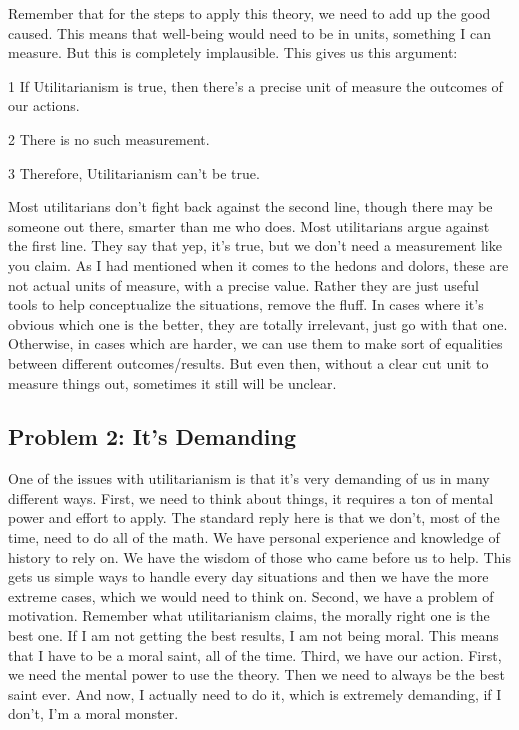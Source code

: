 Remember that for the steps to apply this theory, we need to add up the good caused. This means that well-being would need to be in units, something I can measure. But this is completely implausible. This gives us this argument:
\begin{earg}
    \item[1] If Utilitarianism is true, then there’s a precise unit of measure the outcomes of our actions.
    \item[2] There is no such measurement.
    \item[3] Therefore, Utilitarianism can’t be true.
\end{earg}
Most utilitarians don’t fight back against the second line, though there may be someone out there, smarter than me who does. Most utilitarians argue against the first line. They say that yep, it’s true, but we don’t need a measurement like you claim. As I had mentioned when it comes to the hedons and dolors, these are not actual units of measure, with a precise value. Rather they are just useful tools to help conceptualize the situations, remove the fluff. In cases where it’s obvious which one is the better, they are totally irrelevant, just go with that one. Otherwise, in cases which are harder, we can use them to make sort of equalities between different outcomes/results. But even then, without a clear cut unit to measure things out, sometimes it still will be unclear. 
\subsection{Problem 2: It’s Demanding}

One of the issues with utilitarianism is that it’s very demanding of us in many different ways. First, we need to think about things, it requires a ton of mental power and effort to apply. The standard reply here is that we don’t, most of the time, need to do all of the math. We have personal experience and knowledge of history to rely on. We have the wisdom of those who came before us to help. This gets us simple ways to handle every day situations and then we have the more extreme cases, which we would need to think on. Second, we have a problem of motivation. Remember what utilitarianism claims, the morally right one is the best one. If I am not getting the best results, I am not being moral. This means that I have to be a moral saint, all of the time. Third, we have our action. First, we need the mental power to use the theory. Then we need to always be the best saint ever. And now, I actually need to do it, which is extremely demanding, if I don’t, I’m a moral monster. 

